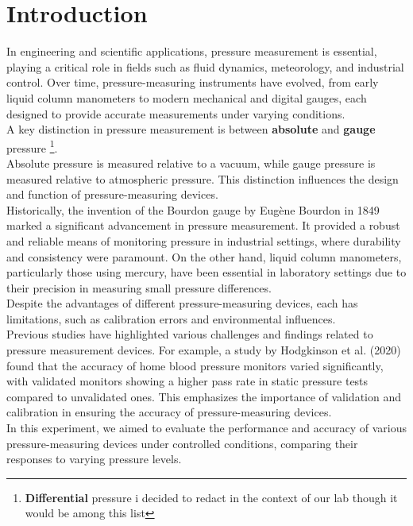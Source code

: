\documentclass{article}
\begin{document}
	
	\newpage\vspace*{-20pt}

	\section{Introduction}
	In engineering and scientific applications, pressure measurement is essential, playing a critical role in fields such as fluid dynamics, meteorology, and industrial control. Over time, pressure-measuring instruments have evolved, from early liquid column manometers to modern mechanical and digital gauges, each designed to provide accurate measurements under varying conditions.\\[1em]
	A key distinction in pressure measurement is between \textbf{absolute} and \textbf{gauge} pressure \footnote{\textbf{Differential} pressure i decided to redact in the context of our lab though it would be among this list}.\\ 
	Absolute pressure is measured relative to a vacuum, while gauge pressure is measured relative to atmospheric pressure. This distinction influences the design and function of pressure-measuring devices.\\[1em]
	Historically, the invention of the Bourdon gauge by Eugène Bourdon in 1849 marked a significant advancement in pressure measurement. It provided a robust and reliable means of monitoring pressure in industrial settings, where durability and consistency were paramount. On the other hand, liquid column manometers, particularly those using mercury, have been essential in laboratory settings due to their precision in measuring small pressure differences.\\[1em]
	Despite the advantages of different pressure-measuring devices, each has limitations, such as calibration errors and environmental influences.\\[1em]
	Previous studies have highlighted various challenges and findings related to pressure measurement devices. For example, a study by Hodgkinson et al. (2020) found that the accuracy of home blood pressure monitors varied significantly, with validated monitors showing a higher pass rate in static pressure tests compared to unvalidated ones. This emphasizes the importance of validation and calibration in ensuring the accuracy of pressure-measuring devices.\\[1em]
	In this experiment, we aimed to evaluate the performance and accuracy of various pressure-measuring devices under controlled conditions, comparing their responses to varying pressure levels.
\end{document}
